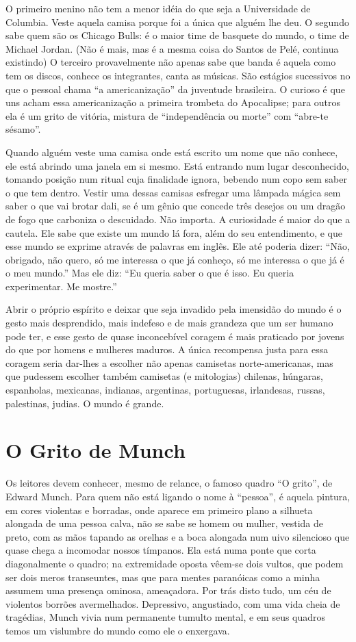 O primeiro menino não tem a menor idéia do que seja a Universidade de
Columbia. Veste aquela camisa porque foi a única que alguém lhe deu.
O segundo sabe quem são os Chicago Bulls: é o maior time de basquete
do mundo, o time de Michael Jordan. (Não é mais, mas é a mesma coisa
do Santos de Pelé, continua existindo) O terceiro provavelmente não
apenas sabe que banda é aquela como tem os discos, conhece os
integrantes, canta as músicas. São estágios sucessivos no que o
pessoal chama “a americanização” da juventude brasileira. O curioso é
que uns acham essa americanização a primeira trombeta do Apocalipse;
para outros ela é um grito de vitória, mistura de “independência ou
morte” com “abre-te sésamo”. 

Quando alguém veste uma camisa onde está escrito um nome que não
conhece, ele está abrindo uma janela em si mesmo. Está entrando num
lugar desconhecido, tomando posição num ritual cuja finalidade
ignora, bebendo num copo sem saber o que tem dentro. Vestir uma
dessas camisas esfregar uma lâmpada mágica sem saber o que vai brotar
dali, se é um gênio que concede três desejos ou um dragão de fogo que
carboniza o descuidado. Não importa. A curiosidade é maior do que a
cautela. Ele sabe que existe um mundo lá fora, além do seu
entendimento, e que esse mundo se exprime através de palavras em
inglês. Ele até poderia dizer: “Não, obrigado, não quero, só me
interessa o que já conheço, só me interessa o que já é o meu mundo.” 
Mas ele diz: “Eu queria saber o que é isso. Eu queria experimentar.
Me mostre.”

Abrir o próprio espírito e deixar que seja invadido pela imensidão do
mundo é o gesto mais desprendido, mais indefeso e de mais grandeza
que um ser humano pode ter, e esse gesto de quase inconcebível
coragem é mais praticado por jovens do que por homens e mulheres
maduros. A única recompensa justa para essa coragem seria dar-lhes a
escolher não apenas camisetas norte-americanas, mas que pudessem
escolher também camisetas (e mitologias) chilenas, húngaras,
espanholas, mexicanas, indianas, argentinas, portuguesas, irlandesas,
russas, palestinas, judias. O mundo é grande.

\chapter{O Grito de Munch}

Os leitores devem conhecer, mesmo de relance, o famoso quadro “O
grito”, de Edward Munch. Para quem não está ligando o nome à
“pessoa”, é aquela pintura, em cores violentas e borradas, onde
aparece em primeiro plano a silhueta alongada de uma pessoa calva,
não se sabe se homem ou mulher, vestida de preto, com as mãos tapando
as orelhas e a boca alongada num uivo silencioso que quase chega a
incomodar nossos tímpanos.  Ela está numa ponte que corta
diagonalmente o quadro; na extremidade oposta vêem-se dois vultos,
que podem ser dois meros transeuntes, mas que para mentes paranóicas
como a minha assumem uma presença ominosa, ameaçadora. Por trás disto
tudo, um céu de violentos borrões avermelhados. Depressivo,
angustiado, com uma vida cheia de tragédias, Munch vivia num
permanente tumulto mental, e em seus quadros temos um vislumbre do
mundo como ele o enxergava.


